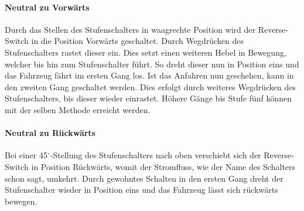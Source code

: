 \paragraph{Neutral zu Vorwärts}
Durch das Stellen des Stufenschalters in waagrechte Position wird der Reverse-Switch in die Position Vorwärts geschaltet. Durch Wegdrücken des Stufenschalters rastet dieser ein. Dies setzt einen weiteren Hebel in Bewegung, welcher bis hin zum Stufenschalter führt. So dreht dieser nun in Position eins und das Fahrzeug fährt im ersten Gang los. Ist das Anfahren nun geschehen, kann in den zweiten Gang geschaltet werden. Dies erfolgt durch weiteres Wegdrücken des Stufenschalters, bis dieser wieder einrastet. Höhere Gänge bis Stufe fünf können mit der selben Methode erreicht werden.

\paragraph{Neutral zu Rückwärts}
Bei einer 45$^\circ$-Stellung des Stufenschalters nach oben verschiebt sich der Reverse-Switch in Position Rückwärts, womit der Stromfluss, wie der Name des Schalters schon sagt, umkehrt. Durch gewohntes Schalten in den ersten Gang dreht der Stufenschalter wieder in Position eins und das Fahrzeug lässt sich rückwärts bewegen.